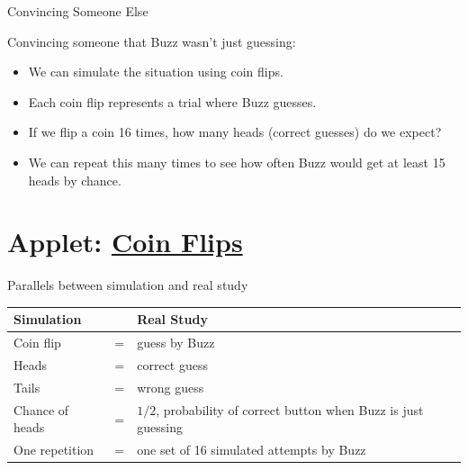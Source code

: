 \documentclass[slidestop,compress,mathserif]{beamer}
\begin{document}
\begin{frame}{Convincing Someone Else}
    \begin{block}{Convincing someone that Buzz wasn't just guessing:}
        \begin{itemize}
            \item We can simulate the situation using coin flips.
            \item Each coin flip represents a trial where Buzz guesses.
            \item If we flip a coin 16 times, how many heads (correct guesses) do we expect?
            \item We can repeat this many times to see how often Buzz would get at least 15 heads by chance.
        \end{itemize}
    \end{block}
\end{frame}

\section{Applet: \href{https://www.isi-stats.com/isi2nd/ISIapplets2021.html}{Coin Flips}}

\begin{frame}{Parallels between simulation and real study}
\begin{table}
    \renewcommand{\arraystretch}{1.4} %
    \begin{tabular}{p{3.0cm} c p{6.0cm}}
        \rowcolor{blue!30!black!15} 
        \textbf{Simulation} & & \textbf{Real Study}\\
        \hline
        Coin flip         & = & guess by Buzz \\
        Heads             & = & correct guess \\
        Tails             & = & wrong guess \\
        Chance of heads   & = & $1/2$, probability of correct button when Buzz is just guessing \\
        One repetition    & = & one set of 16 simulated attempts by Buzz \\
    \end{tabular}
\end{table}
\end{frame}
\end{document}
